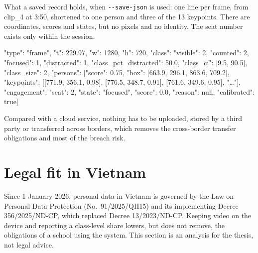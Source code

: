 What a saved record holds, when \texttt{-\/-save-json} is used: one line per frame, from clip\_4 at 3:50, shortened to one person and three of the 13 keypoints. There are coordinates, scores and states, but no pixels and no identity. The seat number exists only within the session.

\begin{codeblock}
{"type": "frame", "t": 229.97, "w": 1280, "h": 720,
 "class": {"visible": 2, "counted": 2, "focused": 1, "distracted": 1,
           "class_pct_distracted": 50.0, "class_ci": [9.5, 90.5], "class_size": 2},
 "persons": [{"score": 0.75, "box": [663.9, 296.1, 863.6, 709.2],
              "keypoints": [[771.9, 356.1, 0.98], [776.5, 348.7, 0.91], [761.6, 349.6, 0.95], "…"],
              "engagement": {"seat": 2, "state": "focused", "score": 0.0, "reason": null, "calibrated": true}}]}
\end{codeblock}

Compared with a cloud service, nothing has to be uploaded, stored by a third party or transferred across borders, which removes the cross-border transfer obligations and most of the breach risk.

\section{Legal fit in Vietnam}

Since 1 January 2026, personal data in Vietnam is governed by the Law on Personal Data Protection (No.~91/2025/QH15) \cite{b12} and its implementing Decree 356/2025/ND-CP, which replaced Decree 13/2023/ND-CP. Keeping video on the device and reporting a class-level share lowers, but does not remove, the obligations of a school using the system. This section is an analysis for the thesis, not legal advice.

